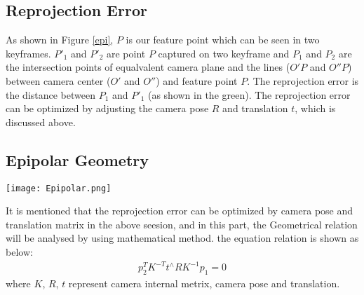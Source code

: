 \subsection{Reprojection Error}
As shown in Figure \ref{epi}, $P$ is our feature point which can be seen in two keyframes. $P'_1$ and $P'_2$ are point $P$ captured on two keyframe and $P_1$ and $P_2$ are the intersection points of equalvalent camera plane and the lines ($O'P$ and $O''P$) between camera center ($O'$ and $O''$) and feature point $P$. The reprojection error is the distance between $P_1$ and $P'_1$ (as shown in the green). The reprojection error can be optimized by adjusting the camera pose $R$ and translation $t$, which is discussed above.

\subsection{Epipolar Geometry}
\begin{figure*}
    \centering
    \texttt{[image: Epipolar.png]}
    \caption{Epipolar Geometry and Reprojection Error}
    \label{epi}
\end{figure*}
It is mentioned that the reprojection error can be optimized by camera pose and translation matrix in the above seesion, and in this part, the Geometrical relation will be analysed by using mathematical method. the equation relation is shown as below:
\begin{align}
    p^T_2K^{-T}t^{\wedge}RK^{-1}p_1 = 0 
\end{align}
where $K$, $R$, $t$ represent camera internal metrix, camera pose and translation.
